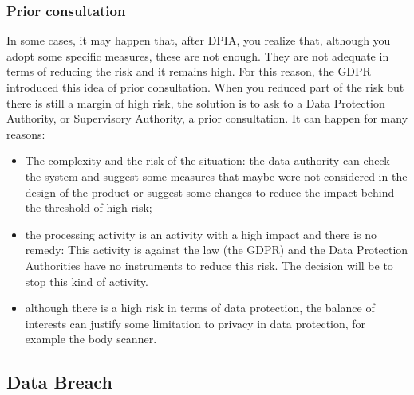 \subsubsection{Prior consultation}
\label{sect:prior_cons}
In some cases, it may happen that, after DPIA, you realize that, although you adopt some specific measures, these are not enough. They are not adequate in terms of reducing the risk and it remains high.
For this reason, the GDPR introduced this idea of prior consultation. When you reduced part of the risk but there is still a margin of high risk, the solution is to ask to a Data Protection Authority, or Supervisory Authority, a prior consultation. It can happen for many reasons:
\begin{itemize}
    \item The complexity and the risk of the situation: the data authority can check the system and suggest some measures that maybe were not considered in the design of the product or suggest some changes to reduce the impact behind the threshold of high risk;
    \item the processing activity is an activity with a high impact and there is no remedy: This activity is against the law (the GDPR) and the Data Protection Authorities have no instruments to reduce this risk. The decision will be to stop this kind of activity.
    \item although there is a high risk in terms of data protection, the balance of interests can justify some limitation to privacy in data protection, for example the body scanner.
\end{itemize}
\subsection{Data Breach}
